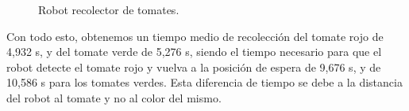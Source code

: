 \begin{figure}[h!]
    \begin{center}
      \subcapcentertrue
      \hspace{2mm}
    \end{center}
    \caption{Robot recolector de tomates.}
    \label{fig:Robots_tomates}
  \end{figure}

Con todo esto, obtenemos un tiempo medio de recolección del tomate rojo de 4,932 s, y del tomate verde de 5,276 s, siendo el tiempo necesario para que el robot detecte el tomate rojo y vuelva a la posición de espera de 9,676 s, y de 10,586 s para los tomates verdes. Esta diferencia de tiempo se debe a la distancia del robot al tomate y no al color del mismo.








